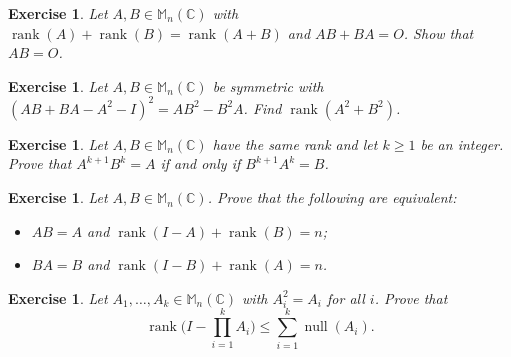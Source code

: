 \documentclass[12pt]{article}
\DeclareMathOperator{\Rank}{rank}
\DeclareMathOperator{\Null}{null}
\theoremstyle{breakplain}
\theoremstyle{breakdef}
\newtheorem{ex}[subsubsection]{Exercise}
\theoremstyle{remark}
\begin{document}
\begin{ex}
    Let $A,B\in \mathbb{M}_n(\mathbb{C})$ with $\Rank(A)+\Rank(B)=\Rank(A+B)$ and $AB+BA=O$. Show that $AB=O$.
\end{ex}
\begin{ex}
    Let $A,B\in \mathbb{M}_n(\mathbb{C})$ be symmetric with $(AB+BA-A^2-I)^2=AB^2-B^2A$. Find $\Rank(A^2+B^2)$.
\end{ex}
\begin{ex}
    Let $A,B\in \mathbb{M}_n(\mathbb{C})$ have the same rank and let $k\geq 1$ be an integer. Prove that $A^{k+1}B^k=A$ if and only if $B^{k+1}A^k=B$.
\end{ex}
\begin{ex}
    Let $A,B\in \mathbb{M}_n(\mathbb{C})$. Prove that the following are equivalent:
    \begin{itemize}
        \item $AB=A$ and $\Rank(I-A)+\Rank(B)=n$;
        \item $BA=B$ and $\Rank(I-B)+\Rank(A)=n$.
    \end{itemize}
\end{ex}
\begin{ex}
    Let $A_1,\ldots, A_k\in \mathbb{M}_n(\mathbb{C})$ with $A_i^2=A_i$ for all $i$. Prove that
    \[\Rank\Big(I-\prod_{i=1}^{k} A_i\Big)\leq \sum_{i=1}^k\Null(A_i).\]
\end{ex}
\end{document}
